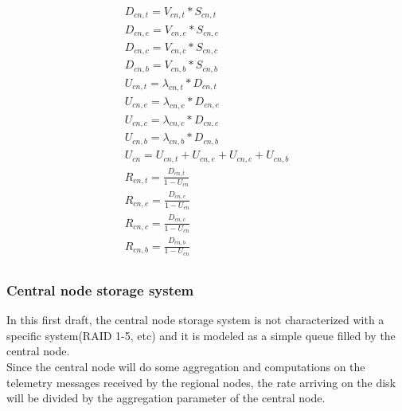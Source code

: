 \documentclass[11pt]{article}
\begin{document}
\begin{equation}
	\begin{array}{l}
		D_{cn, t} = V_{cn, t} * S_{cn, t} \\
		D_{cn, e} = V_{cn, e} * S_{cn, e} \\
		D_{cn, c} = V_{cn, c} * S_{cn, c} \\
		D_{cn, b} = V_{cn, b} * S_{cn, b} \\
		U_{cn, t} = \lambda_{cn, t} * D_{cn, t} \\
		U_{cn, e} = \lambda_{cn, e} * D_{cn, e} \\
		U_{cn, c} = \lambda_{cn, c} * D_{cn, c} \\
		U_{cn, b} = \lambda_{cn, b} * D_{cn, b} \\
        U_{cn} = U_{cn, t} + U_{cn, e} + U_{cn, c} + U_{cn, b} \\
		R_{cn, t} = \frac{D_{cn, t}}{1 - U_{cn}} \\
		R_{cn, e} = \frac{D_{cn, e}}{1 - U_{cn}} \\
		R_{cn, c} = \frac{D_{cn, c}}{1 - U_{cn}} \\
		R_{cn, b} = \frac{D_{cn, b}}{1 - U_{cn}} \\
	\end{array}
\end{equation}

\subsubsection{Central node storage system}
In this first draft, the central node storage system is not characterized with a specific system(RAID 1-5, etc) and it is modeled as a simple queue filled by the central node.\\
Since the central node will do some aggregation and computations on the telemetry messages received by the regional nodes, the rate arriving on the disk will be divided by the aggregation parameter of the central node.\\
\end{document}

